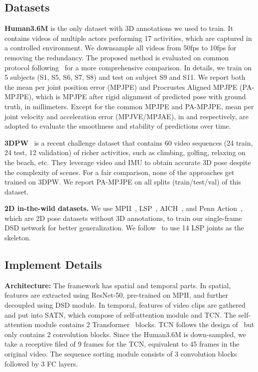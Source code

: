 \documentclass[10pt,twocolumn,letterpaper]{article}
\begin{document}
\subsection{Datasets} \label{Dataset}

\noindent\textbf{Human3.6M} is the only dataset with 3D annotations we used to train. It contains videos of multiple actors performing 17 activities, which are captured in a controlled environment. We downsample all videos from 50fps to 10fps for removing the redundancy. The proposed method is evaluated on common protocol following~\cite{hmr} for a more comprehensive comparison. In details, we train on 5 subjects (S1, S5, S6, S7, S8) and test on subject S9 and S11. We report both the mean per joint position error (MPJPE) and Procrustes Aligned MPJPE (PA-MPJPE), which is MPJPE after rigid alignment of predicted pose with ground truth, in millimeters. Except for the common MPJPE and PA-MPJPE, mean per joint velocity and acceleration error (MPJVE/MPJAE), in  and  respectively, are adopted to evaluate the smoothness and stability of predictions over time. 


\noindent\textbf{3DPW}~\cite{3dpw} is a recent challenge dataset that contains 60 video sequences (24 train, 24 test, 12 validation) of richer activities, such as climbing, golfing, relaxing on the beach, etc. They leverage video and IMU to obtain accurate 3D pose despite the complexity of scenes. For a fair comparison, none of the approaches get trained on 3DPW. We report PA-MPJPE on all splits (train/test/val) of this dataset.

\noindent\textbf{2D in-the-wild datasets.} We use MPII~\cite{mpii}, LSP~\cite{lsp}, AICH~\cite{aich}, and Penn Action~\cite{pennaction}, which are 2D pose datasets without 3D annotations, to train our single-frame DSD network for better generalization. We follow~\cite{keep,unite,hmr} to use 14 LSP joints as the skeleton.

\subsection{Implement Details}
\textbf{Architecture:} The framework has spatial and temporal parts. In spatial, features are extracted using ResNet-50, pre-trained on MPII, and further decoupled using DSD module. In temporal, features of video clips are gathered and put into SATN, which compose of self-attention module and TCN. The self-attention module contains 2 Transformer~\cite{transformer} blocks. TCN follows the design of~\cite{3dvideopose,tcn} but only contains 2 convolution blocks. Since the Human3.6M is down-sampled, we take a receptive filed of 9 frames for the TCN, equivalent to 45 frames in the original video. The sequence sorting module consists of 3 convolution blocks followed by 3 FC layers. 
\end{document}
